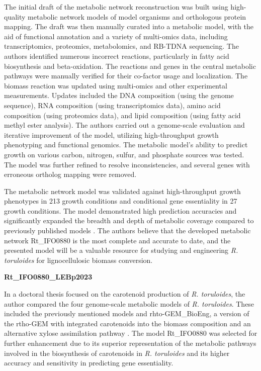 The initial draft of the metabolic network reconstruction was built using high-quality metabolic network models of model organisms and orthologous protein mapping. The draft was then manually curated into a metabolic model, with the aid of functional annotation and a variety of multi-omics data, including transcriptomics, proteomics, metabolomics, and RB-TDNA sequencing.
The authors identified numerous incorrect reactions, particularly in fatty acid biosynthesis and beta-oxidation. The reactions and genes in the central metabolic pathways were manually verified for their co-factor usage and localization. The biomass reaction was updated using multi-omics and other experimental measurements. Updates included the DNA composition (using the genome sequence), RNA composition (using transcriptomics data), amino acid composition (using proteomics data), and lipid composition (using fatty acid methyl ester analysis).
The authors carried out a genome-scale evaluation and iterative improvement of the model, utilizing high-throughput growth phenotyping and functional genomics. The metabolic model's ability to predict growth on various carbon, nitrogen, sulfur, and phosphate sources was tested. The model was further refined to resolve inconsistencies, and several genes with erroneous ortholog mapping were removed. \cite{Kim2021}
 
The metabolic network model was validated against high-throughput growth phenotypes in 213 growth conditions and conditional gene essentiality in 27 growth conditions. The model demonstrated high prediction accuracies and significantly expanded the breadth and depth of metabolic coverage compared to previously published models \cite{Dinh2019, Tiukova2019}.
The authors believe that the developed metabolic network Rt\_IFO0880 is the most complete and accurate to date, and the presented model will be a valuable resource for studying and engineering \textit{R. toruloides} for lignocellulosic biomass conversion. \cite{Kim2021}


\textbf{Rt\_IFO0880\_LEBp2023}

In a doctoral thesis focused on the carotenoid production of \textit{R. toruloides}, the author compared the four genome-scale metabolic models of \textit{R. toruloides}. These included the previously mentioned models and rhto-GEM\_BioEng, a version of the rtho-GEM with integrated carotenoids into the biomass composition and an alternative xylose assimilation pathway \cite{Rekena2023}. The model Rt\_IFO0880 was selected for further enhancement due to its superior representation of the metabolic pathways involved in the biosynthesis of carotenoids in \textit{R. toruloides} and its higher accuracy and sensitivity in predicting gene essentiality. \cite{DeBiaggi2023}

